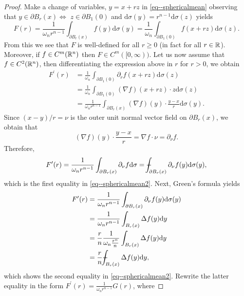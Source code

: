 \documentclass[11pt]{article}
\begin{document}
				\begin{proof}
					Make a change of variables, $y=x+rz$ in \eqref{eq--sphericalmean} observing that $y\in\partial B_r(x)\Longleftrightarrow$ $z\in\partial B_1(0)$ and $\mathrm{d}\sigma(y)=r^{n-1}\mathrm{d}\sigma(z)$ yields
					\begin{equation*}
						F(r)=\frac{1}{\omega_nr^{n-1}}\int_{\partial B_r(x)}f(y)\mathrm{d}\sigma(y)=\frac{1}{\omega_n}\int_{\partial B_1(0)}f(x+rz)\mathrm{d}\sigma(z).
					\end{equation*}
					From this we see that $F$ is well-defined for all $r\ge0$ (in fact for all $r\in\mathbb{R}$). Moreover, if $f\in C^m(\mathbb{R}^n)$ then $F\in C^m([0,\infty))$. Let us now assume that $f\in C^2(\mathbb{R}^n)$, then differentiating the expression above in $r$ for $r>0$, we obtain 
					\begin{align*}
						F^\prime(r)&=\frac{1}{\omega_n}\int_{\partial B_1(0)}\partial_rf(x+rz)\mathrm{d}\sigma(z)\\
						&=\frac{1}{\omega_n}\int_{\partial B_1(0)}(\nabla f)(x+rz)\cdot z\mathrm{d}\sigma(z)\\
						&=\frac{1}{\omega_nr^{n-1}}\int_{\partial B_r(x)}(\nabla f)(y)\cdot\frac{y-x}{r}\mathrm{d}\sigma(y).
					\end{align*}
					Since $(x-y)/r=\nu$ is the outer unit normal vector field on $\partial B_r(x)$, we obtain that 
					\begin{equation*}
						(\nabla f)(y)\cdot\frac{y-x}{r}=\nabla f\cdot\nu=\partial_\nu f.
					\end{equation*}
					Therefore,
					\begin{equation*}
						F^\prime(r)=\frac{1}{\omega_nr^{n-1}}\int_{\partial B_r(x)}\partial_\nu f\mathrm{d}\sigma=\dashint_{\partial B_r(x)}\partial_\nu f(y)\mathrm{d}\sigma(y),
					\end{equation*}
					which is the first equality in \eqref{eq--sphericalmean2}. Next, Green's formula yields
					\begin{align*}
						F^\prime(r)&=\frac{1}{\omega_nr^{n-1}}\int_{\partial B_r(x)}\partial_\nu f(y)\mathrm{d}\sigma(y)\\
						&=\frac{1}{\omega_nr^{n-1}}\int_{B_r(x)}\Delta f(y)\mathrm{d}y\\
						&=\frac{r}{n}\frac{1}{\omega_n\frac{r^n}{n}}\int_{B_r(x)}\Delta f(y)\mathrm{d}y\\
						&=\frac{r}{n}\dashint_{B_r(x)}\Delta f(y)\mathrm{d}y,
					\end{align*}
					which shows the second equality in \eqref{eq--sphericalmean2}. Rewrite the latter equality in the form $F^\prime(r)=\frac{1}{\omega_nr^{n-1}}G(r)$, where

\end{proof}
\end{document}
